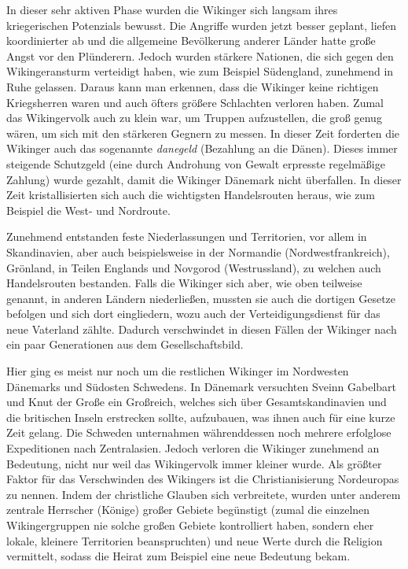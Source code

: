 \documentclass[12pt,a4paper,ngerman,openany]{book}
\begin{document}
\begin{tcolorbox}[sharp corners, title=Ungefähr 850 bis 900]
In dieser sehr aktiven Phase wurden die Wikinger sich langsam ihres kriegerischen Potenzials bewusst. Die Angriffe wurden jetzt besser geplant, liefen koordinierter ab und die allgemeine Bevölkerung anderer Länder hatte große Angst vor den Plünderern.
Jedoch wurden stärkere Nationen, die sich gegen den Wikingeransturm verteidigt haben, wie zum Beispiel Südengland, zunehmend in Ruhe gelassen. Daraus kann man erkennen, dass die Wikinger keine richtigen Kriegsherren waren und auch öfters größere Schlachten verloren haben. Zumal das Wikingervolk auch zu klein war, um Truppen aufzustellen, die groß genug wären, um sich mit den stärkeren Gegnern zu messen.
In dieser Zeit forderten die Wikinger auch das sogenannte \textit{danegeld} (\glqq Bezahlung an die Dänen\grqq{}). Dieses immer steigende Schutzgeld (eine durch Androhung von Gewalt erpresste regelmäßige Zahlung) wurde gezahlt, damit die Wikinger Dänemark nicht überfallen.
In dieser Zeit kristallisierten sich auch die wichtigsten Handelsrouten heraus, wie zum Beispiel die West- und Nordroute.
\end{tcolorbox}

\begin{tcolorbox}[sharp corners, title=Ungefähr 900 bis 980]
Zunehmend entstanden feste Niederlassungen und Territorien, vor allem in Skandinavien, aber auch beispielsweise in der Normandie (Nordwestfrankreich), Grönland, in Teilen Englands und Novgorod (Westrussland), zu welchen auch Handelsrouten bestanden. Falls die Wikinger sich aber, wie oben teilweise genannt, in anderen Ländern niederließen, mussten sie auch die dortigen Gesetze befolgen und sich dort eingliedern, wozu auch der Verteidigungsdienst für das \glqq neue\grqq{} Vaterland zählte. Dadurch verschwindet in diesen Fällen \glqq der Wikinger\grqq{} nach ein paar Generationen aus dem Gesellschaftsbild.
\end{tcolorbox}

\begin{tcolorbox}[sharp corners, title=Ungefähr 980 bis 1066]
Hier ging es meist nur noch um die restlichen Wikinger im Nordwesten Dänemarks und Südosten Schwedens.
In Dänemark versuchten Sveinn Gabelbart und Knut der Große ein Großreich, welches sich über Gesamtskandinavien und die britischen Inseln erstrecken sollte, aufzubauen, was ihnen auch für eine kurze Zeit gelang. Die Schweden unternahmen währenddessen noch mehrere erfolglose Expeditionen nach Zentralasien.
Jedoch verloren die Wikinger zunehmend an Bedeutung, nicht nur weil das Wikingervolk immer kleiner wurde. Als größter Faktor für das \glqq Verschwinden\grqq{} des Wikingers ist die Christianisierung Nordeuropas zu nennen. Indem der christliche Glauben sich verbreitete, wurden unter anderem zentrale Herrscher (Könige) großer Gebiete begünstigt (zumal die einzelnen Wikingergruppen nie solche großen Gebiete kontrolliert haben, sondern eher lokale, kleinere Territorien beanspruchten) und neue Werte durch die Religion vermittelt, sodass die Heirat zum Beispiel eine neue Bedeutung bekam.
\end{tcolorbox}
\end{document}
